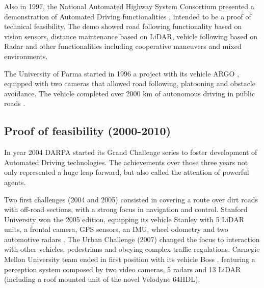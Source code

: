 Also in 1997, the National Automated Highway System Consortium presented a 
demonstration of Automated Driving functionalities \cite{Thorpe1997}, intended 
to be a proof of technical feasibility. 
The demo showed road following functionality based on vision sensors, distance 
maintenance based on LiDAR, vehicle following based on Radar and other 
functionalities including cooperative maneuvers and mixed environments.

The University of Parma started in 1996 a project with its vehicle 
ARGO \cite{Broggi1998}, equipped with two cameras that allowed road following,
platooning and obstacle avoidance. The vehicle completed over 2000 km of 
autonomous driving in public roads \cite{Broggi1999}.


\subsection{Proof of feasibility (2000-2010)}

In year 2004 DARPA started its Grand Challenge series to foster development of
Automated Driving technologies. The achievements over those three years 
not only represented a huge leap forward, but also called the attention of
powerful agents.

Two first challenges (2004 and 2005) consisted in covering a route over dirt
roads with off-road sections, with a strong focus in navigation and control.
Stanford University won the 2005 edition, equipping its vehicle Stanley with
5 LiDAR units, a frontal camera, GPS sensors, an IMU, wheel odometry and two 
automotive radars \cite{Thrun2006}. 
The Urban Challenge (2007) changed the focus to interaction with other vehicles,
pedestrians and obeying complex traffic regulations. Carnegie Mellon University
team ended in first position with its vehicle Boss \cite{TartanRacing2005}
\cite{Urmson2007}, 
featuring a perception system composed by two video cameras, 5 radars and 13
LiDAR (including a roof mounted unit of the novel Velodyne 64HDL).


